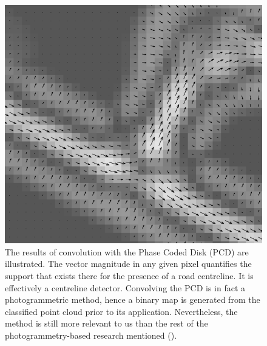 \begin{figure}
    \includegraphics[width=\linewidth]{p2/figs/clode_etal_2007_01.png} 
    \caption{The results of convolution with the Phase Coded Disk (PCD) are illustrated. The vector magnitude in any given pixel quantifies the support that exists there for the presence of a road centreline. It is effectively a centreline detector. Convolving the PCD is in fact a photogrammetric method, hence a binary map is generated from the classified point cloud prior to its application. Nevertheless, the method is still more relevant to us than the rest of the photogrammetry-based research mentioned (\cite{clode_etal_2007}).}
    \label{fig:phasecodeddisk}
\end{figure}

